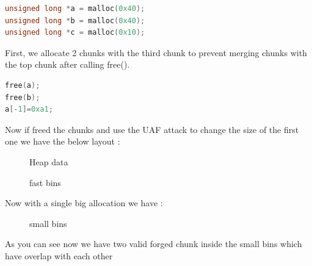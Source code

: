 \documentclass{masterthesis}
\newcommand*\fb{fast bins}
\newcommand*\sbs{small bins}
\begin{document}
\begin{lstlisting}[language=c,frame=tlrb]
unsigned long *a = malloc(0x40);
unsigned long *b = malloc(0x40);
unsigned long *c = malloc(0x10);
\end{lstlisting}

First, we allocate 2 chunks with the third chunk to prevent merging chunks with the top chunk after calling free(). 

\begin{lstlisting}[language=c,frame=tlrb]
free(a);
free(b);
a[-1]=0xa1;
\end{lstlisting}

Now if freed the chunks and use the UAF attack to change the size of the first one we have the below layout :

\begin{figure}[h!]
  \caption{Heap data}
\end{figure}

\begin{figure}[h!]
  \caption{\fb{}}
\end{figure}

Now with a single big allocation we have :
\begin{figure}[h!]
  \caption{\sbs{}}
\end{figure}

As you can see now we have two valid forged chunk inside the \sbs{} which have overlap with each other
\end{document}
